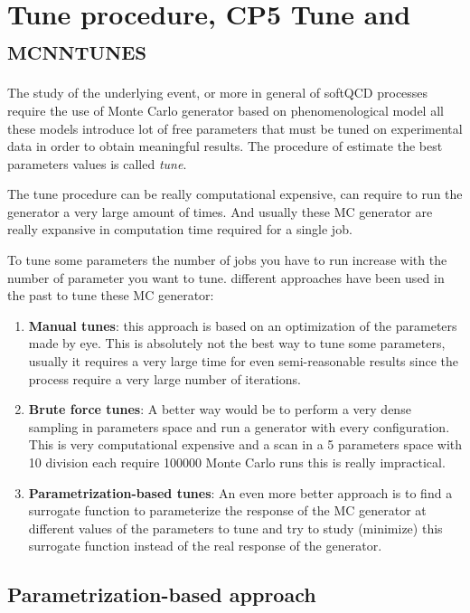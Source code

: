 \chapter{Tune procedure, CP5 Tune and \textsc{mcnntunes}}
\label{chap:TuneprocedureCP5TuneandMCNNTUNES}

The study of the underlying event, or more in general of softQCD processes require the use of Monte Carlo generator based on phenomenological model all these models introduce lot of free parameters that must be tuned on experimental data in order to obtain meaningful results. The procedure of estimate the best parameters values is called \textit{tune}. 

The tune procedure can be really computational expensive,  can require to run the generator a very large amount of times. And usually these MC generator are really expansive in computation time required for a single job. 

To tune some parameters the number of jobs you have to run increase with the number of parameter you want to tune. different approaches have been used in the past to tune these MC generator:
\begin{enumerate}[label=\arabic*)]
	\item \textbf{Manual tunes}: this approach is based on an optimization of the parameters made by eye. This is absolutely not the best way to tune some parameters, usually it requires a very large time for even semi-reasonable results since the process require a very large number of iterations.   
	\item \textbf{Brute force tunes}: A better way would be to perform a very dense sampling in parameters space and run a generator with every configuration. This is very computational expensive and a scan in a 5 parameters space with 10 division each require 100000 Monte Carlo runs this is really impractical.   
	\item \textbf{Parametrization-based tunes}: An even more better approach is to find a surrogate function to parameterize the response of the MC generator at different values of the parameters to tune and try to study (minimize) this surrogate function instead of the real response of the generator.
\end{enumerate}

\section{Parametrization-based approach}

